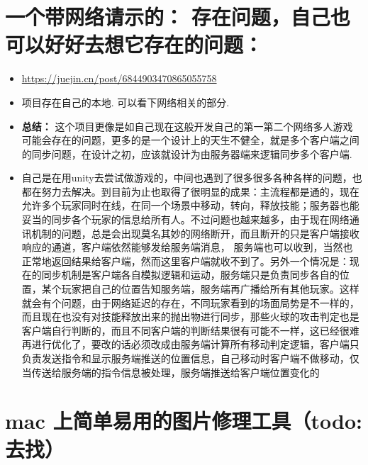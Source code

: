 \documentclass[9pt, b5paper]{article}
\begin{document}
\section{一个带网络请示的： 存在问题，自己也可以好好去想它存在的问题：}
\label{sec-5}
\begin{itemize}
\item \url{https://juejin.cn/post/6844903470865055758}
\item 项目存在自己的本地. 可以看下网络相关的部分.
\item \textbf{总结：} 这个项目更像是如自己现在这般开发自己的第一第二个网络多人游戏可能会存在的问题，更多的是一个设计上的天生不健全，就是多个客户端之间的同步问题，在设计之初，应该就设计为由服务器端来逻辑同步多个客户端.
\item 自己是在用unity去尝试做游戏的，中间也遇到了很多很多各种各样的问题，也都在努力去解决。到目前为止也取得了很明显的成果：主流程都是通的，现在允许多个玩家同时在线，在同一个场景中移动，转向，释放技能；服务器也能妥当的同步各个玩家的信息给所有人。不过问题也越来越多，由于现在网络通讯机制的问题，总是会出现莫名其妙的网络断开，而且断开的只是客户端接收响应的通道，客户端依然能够发给服务端消息， 服务端也可以收到，当然也正常地返回结果给客户端，然而这里客户端就收不到了。另外一个情况是：现在的同步机制是客户端各自模拟逻辑和运动，服务端只是负责同步各自的位置，某个玩家把自己的位置告知服务端，服务端再广播给所有其他玩家。这样就会有个问题，由于网络延迟的存在，不同玩家看到的场面局势是不一样的，而且现在也没有对技能释放出来的抛出物进行同步，那些火球的攻击判定也是客户端自行判断的，而且不同客户端的判断结果很有可能不一样，这已经很难再进行优化了，要改的话必须改成由服务端计算所有移动判定逻辑，客户端只负责发送指令和显示服务端推送的位置信息，自己移动时客户端不做移动，仅当传送给服务端的指令信息被处理，服务端推送给客户端位置变化的
\end{itemize}
\section{mac 上简单易用的图片修理工具（todo: 去找）}
\label{sec-6}
\end{document}
